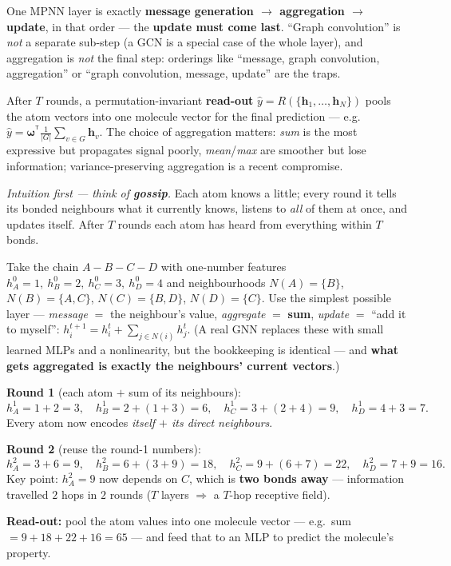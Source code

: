 \documentclass[11pt, oneside]{book}
\newcommand{\T}{^{\mathsf{T}}}           %
\begin{document}
\begin{starbox}[title={Exam-critical: the one-layer order is message $\to$ aggregate $\to$ update}]
One MPNN layer is exactly \textbf{message generation $\to$ aggregation $\to$
update}, in that order --- the \textbf{update must come last}. ``Graph convolution''
is \emph{not} a separate sub-step (a GCN is a special case of the whole layer), and
aggregation is \emph{not} the final step: orderings like ``message, graph
convolution, aggregation'' or ``graph convolution, message, update'' are the traps.
\end{starbox}

After $T$ rounds, a permutation-invariant \textbf{read-out}
$\hat{y} = R(\{\bm{h}_1,\dots,\bm{h}_N\})$ pools the atom vectors into one
molecule vector for the final prediction --- e.g.\
$\hat y = \bm{\omega}^{\!\T}\frac{1}{|G|}\sum_{v\in G}\bm{h}_v$. The choice of
aggregation matters: \emph{sum} is the most expressive but propagates signal
poorly, \emph{mean}/\emph{max} are smoother but lose information; variance-preserving
aggregation is a recent compromise.

\newpage

\begin{exbox}[title={Message passing by hand: a 4-atom chain}]
\emph{Intuition first --- think of \textbf{gossip}.} Each atom knows a little; every
round it tells its bonded neighbours what it currently knows, listens to \emph{all}
of them at once, and updates itself. After $T$ rounds each atom has heard from
everything within $T$ bonds.

Take the chain $A\!-\!B\!-\!C\!-\!D$ with one-number features
$h_A^0{=}1,\ h_B^0{=}2,\ h_C^0{=}3,\ h_D^0{=}4$ and neighbourhoods
$N(A){=}\{B\}$, $N(B){=}\{A,C\}$, $N(C){=}\{B,D\}$, $N(D){=}\{C\}$. Use the simplest
possible layer --- \emph{message} $=$ the neighbour's value, \emph{aggregate} $=$
\textbf{sum}, \emph{update} $=$ ``add it to myself'':
$h_i^{t+1}=h_i^t+\sum_{j\in N(i)}h_j^t$. (A real GNN replaces these with small learned
MLPs and a nonlinearity, but the bookkeeping is identical --- and \textbf{what gets
aggregated is exactly the neighbours' current vectors}.)

\textbf{Round 1} (each atom $+$ sum of its neighbours):
\[
h_A^1{=}1{+}2{=}3,\quad h_B^1{=}2{+}(1{+}3){=}6,\quad
h_C^1{=}3{+}(2{+}4){=}9,\quad h_D^1{=}4{+}3{=}7.
\]
Every atom now encodes \emph{itself $+$ its direct neighbours}.

\textbf{Round 2} (reuse the round-1 numbers):
\[
h_A^2{=}3{+}6{=}9,\quad h_B^2{=}6{+}(3{+}9){=}18,\quad
h_C^2{=}9{+}(6{+}7){=}22,\quad h_D^2{=}7{+}9{=}16.
\]
Key point: $h_A^2{=}9$ now depends on $C$, which is \textbf{two bonds away} ---
information travelled $2$ hops in $2$ rounds ($T$ layers $\Rightarrow$ a $T$-hop
receptive field).

\textbf{Read-out:} pool the atom values into one molecule vector --- e.g.\ sum
$=9{+}18{+}22{+}16{=}65$ --- and feed that to an MLP to predict the molecule's
property.
\end{exbox}
\end{document}
